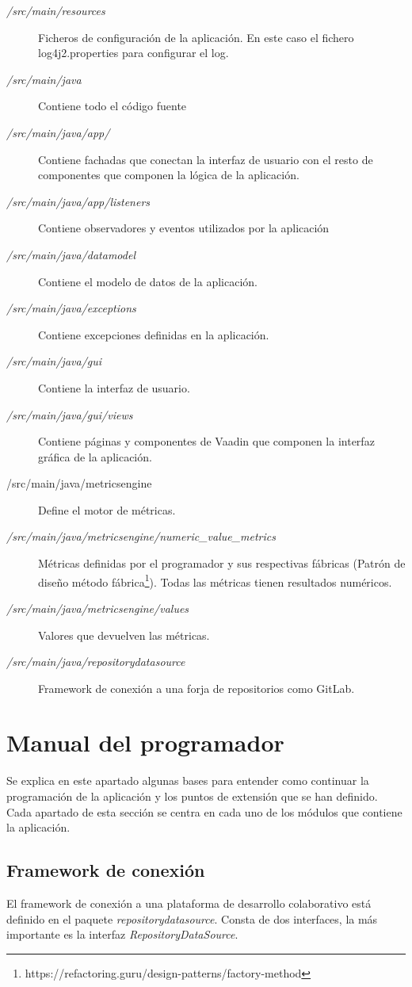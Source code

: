 \begin{description}
	\item[\textit{/src/main/resources}] Ficheros de configuración de la aplicación. En este caso el fichero log4j2.properties para configurar el log.
	\item[\textit{/src/main/java}] Contiene todo el código fuente
	\item[\textit{/src/main/java/app/}] Contiene fachadas que conectan la interfaz de usuario con el resto de componentes que componen la lógica de la aplicación.
	\item[\textit{/src/main/java/app/listeners}] Contiene observadores y eventos utilizados por la aplicación
	\item[\textit{/src/main/java/datamodel}] Contiene el modelo de datos de la aplicación.
	\item[\textit{/src/main/java/exceptions}] Contiene excepciones definidas en la aplicación.
	\item[\textit{/src/main/java/gui}] Contiene la interfaz de usuario.
	\item[\textit{/src/main/java/gui/views}] Contiene páginas y componentes de Vaadin que componen la interfaz gráfica de la aplicación.
	\item[/src/main/java/metricsengine] Define el motor de métricas.
	\item[\textit{/src/main/java/metricsengine/numeric\_value\_metrics}] Métricas definidas por el programador y sus respectivas fábricas (Patrón de diseño método fábrica\footnote{https://refactoring.guru/design-patterns/factory-method}). Todas las métricas tienen resultados numéricos.
	\item[\textit{/src/main/java/metricsengine/values}] Valores que devuelven las métricas.
	\item[\textit{/src/main/java/repositorydatasource}] Framework de conexión a una forja de repositorios como GitLab.
\end{description}
\section{Manual del programador}
Se explica en este apartado algunas bases para entender como continuar la programación de la aplicación y los puntos de extensión que se han definido.
Cada apartado de esta sección se centra en cada uno de los módulos que contiene la aplicación.
\subsection{Framework de conexión}
El framework de conexión a una plataforma de desarrollo colaborativo está definido en el paquete \textit{repositorydatasource}. Consta de dos interfaces, la más importante es la interfaz \textit{RepositoryDataSource}.
